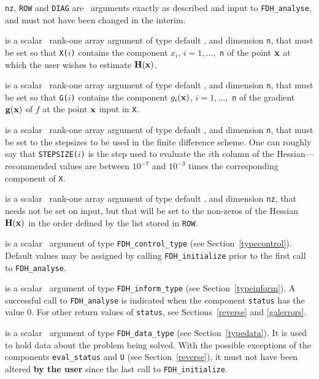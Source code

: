 \documentclass{galahad}
\newcommand{\packagename}{FDH}
\begin{document}
\vspace*{-2mm}
\begin{description}
 {\tt nz}, {\tt ROW} and {\tt DIAG} are  \intentin\ arguments 
exactly as described and input to {\tt \packagename\_analyse},
and must not have been changed in the interim.

 is a scalar \intentin\ rank-one array argument of type 
default \realdp, and dimension {\tt n}, that  must be set so that
{\tt X(}$i${\tt)} contains the component $x_i$, $i = 1, \ldots,$ {\tt n} 
of the point ${\mathbf{x}}$ at which the user wishes to estimate ${\mathbf{H}}({\mathbf{x}})$.

 is a scalar \intentin\ rank-one array argument of type 
default \realdp, and dimension {\tt n}, that must be set so that
{\tt G(}$i${\tt)} contains the component $g_i({\mathbf{x}})$, $i = 1, \ldots,$ {\tt n} 
of the gradient ${\mathbf{g}}({\mathbf{x}})$ of $f$ at the point ${\mathbf{x}}$ input in {\tt X}.

 is a scalar \intentin\ rank-one array argument of type 
default \realdp, and dimension {\tt n}, that must be set to the stepsizes
to be used in the finite difference scheme.  One can roughly say that 
{\tt STEPSIZE(}$i${\tt)} is the step used to evaluate the $i$th column 
of the Hessian---recommended values are between $10^{-7}$ and $10^{-3}$
times the corresponding  component of {\tt X}.

 is a scalar \intentinout\ rank-one array argument of type 
default \realdp, and dimension {\tt nz}, that needs not be set on input,
but that will be set to the non-zeros of the Hessian ${\mathbf{H}}({\mathbf{x}})$ in the
order defined by the list stored in {\tt ROW}.

 is a scalar \intentin\ argument of type 
{\tt \packagename\_control\_type}
(see Section~\ref{typecontrol}). Default values may be assigned by calling 
{\tt \packagename\_initialize} prior to the first call to 
{\tt \packagename\_analyse}. 

 is a scalar \intentinout\ argument of type 
{\tt \packagename\_inform\_type}
(see Section~\ref{typeinform}). 
A successful call to
{\tt \packagename\_analyse}
is indicated when the  component {\tt status} has the value 0. 
For other return values of {\tt status}, see Sections~\ref{reverse} and
\ref{galerrors}.

 is a scalar \intentinout\ argument of type 
{\tt \packagename\_data\_type}
(see Section~\ref{typedata}). It is used to hold data about the problem being 
solved. With the possible exceptions of the components 
{\tt eval\_status} and {\tt U} (see Section~\ref{reverse}), 
it must not have been altered {\bf by the user} since the last call to 
{\tt \packagename\_initialize}.


\end{description}
\end{document}
